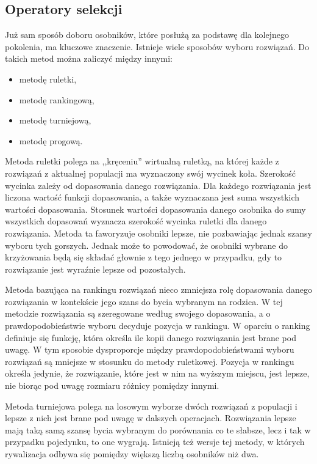 \subsection{Operatory selekcji}
Już sam sposób doboru osobników, które posłużą za podstawę dla kolejnego pokolenia, ma kluczowe znaczenie. Istnieje wiele sposobów wyboru rozwiązań. Do takich metod można zaliczyć między innymi:
\begin{itemize}
\item metodę ruletki,
\item metodę rankingową,
\item metodę turniejową,
\item metodę progową.
\end{itemize}

Metoda ruletki polega na ,,kręceniu'' wirtualną ruletką, na której każde z rozwiązań z aktualnej populacji ma wyznaczony swój wycinek koła. Szerokość wycinka zależy od dopasowania danego rozwiązania. Dla każdego rozwiązania jest liczona wartość funkcji dopasowania, a także wyznaczana jest suma wszystkich wartości dopasowania. Stosunek wartości dopasowania danego osobnika do sumy wszystkich dopasowań wyznacza szerokość wycinka ruletki dla danego rozwiązania. Metoda ta faworyzuje osobniki lepsze, nie pozbawiając jednak szansy wyboru tych gorszych. Jednak może to powodować, że osobniki wybrane do krzyżowania będą się składać głownie z tego jednego w przypadku, gdy to rozwiązanie jest wyraźnie lepsze od pozostałych.

Metoda bazująca na rankingu rozwiązań nieco zmniejsza rolę dopasowania danego rozwiązania w kontekście jego szans do bycia wybranym na rodzica. W tej metodzie rozwiązania są szeregowane według swojego dopasowania, a o prawdopodobieństwie wyboru decyduje pozycja w rankingu. W oparciu o ranking definiuje się funkcję, która określa ile kopii danego rozwiązania jest brane pod uwagę. W tym sposobie dysproporcje między prawdopodobieństwami wyboru rozwiązań są mniejsze w stosunku do metody ruletkowej. Pozycja w rankingu określa jedynie, że rozwiązanie, które jest w nim na wyższym miejscu, jest lepsze, nie biorąc pod uwagę rozmiaru różnicy pomiędzy innymi.

Metoda turniejowa polega na losowym wyborze dwóch rozwiązań z populacji i lepsze z nich jest brane pod uwagę w dalszych operacjach. Rozwiązania lepsze mają taką samą szansę bycia wybranym do porównania co te słabsze, lecz i tak w przypadku pojedynku, to one wygrają. Istnieją też wersje tej metody, w których rywalizacja odbywa się pomiędzy większą liczbą osobników niż dwa.

